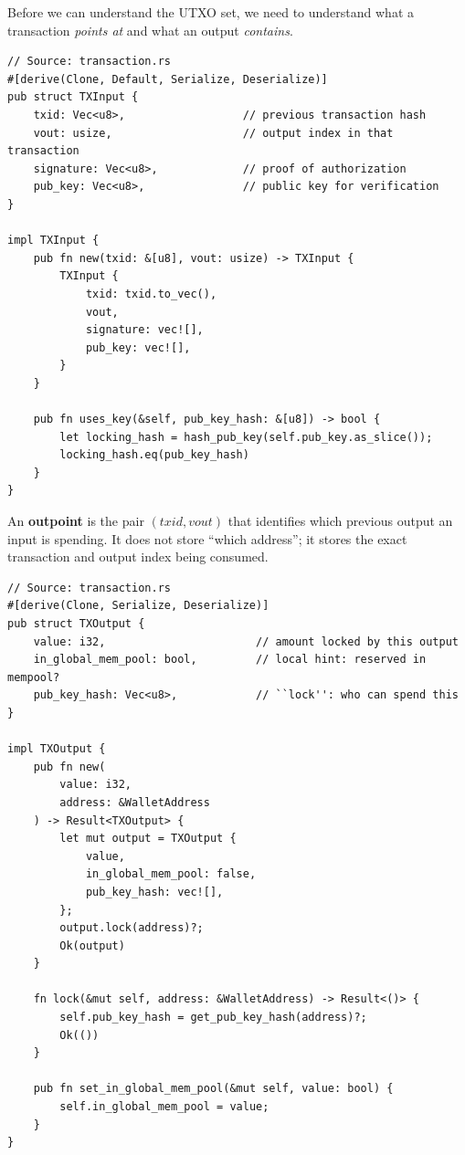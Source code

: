 Before we can understand the UTXO set, we need to understand what a transaction \emph{points at} and what an output \emph{contains}.

\begin{listing}[htbp]
\caption{: reference to a previous output and authorization}
\label{lst:ch09-4-2}
\begin{verbatim}
// Source: transaction.rs
#[derive(Clone, Default, Serialize, Deserialize)]
pub struct TXInput {
    txid: Vec<u8>,                  // previous transaction hash
    vout: usize,                    // output index in that transaction
    signature: Vec<u8>,             // proof of authorization
    pub_key: Vec<u8>,               // public key for verification
}

impl TXInput {
    pub fn new(txid: &[u8], vout: usize) -> TXInput {
        TXInput {
            txid: txid.to_vec(),
            vout,
            signature: vec![],
            pub_key: vec![],
        }
    }

    pub fn uses_key(&self, pub_key_hash: &[u8]) -> bool {
        let locking_hash = hash_pub_key(self.pub_key.as_slice());
        locking_hash.eq(pub_key_hash)
    }
}
\end{verbatim}
\end{listing}

\begin{notebox}
An \textbf{outpoint} is the pair \((txid, vout)\) that identifies which previous output an input is spending. It does not store ``which address''; it stores the exact transaction and output index being consumed.
\end{notebox}

\begin{listing}[htbp]
\caption{: value and the ``in mempool'' flag}
\label{lst:ch09-4-3}
\begin{verbatim}
// Source: transaction.rs
#[derive(Clone, Serialize, Deserialize)]
pub struct TXOutput {
    value: i32,                       // amount locked by this output
    in_global_mem_pool: bool,         // local hint: reserved in mempool?
    pub_key_hash: Vec<u8>,            // ``lock'': who can spend this
}

impl TXOutput {
    pub fn new(
        value: i32,
        address: &WalletAddress
    ) -> Result<TXOutput> {
        let mut output = TXOutput {
            value,
            in_global_mem_pool: false,
            pub_key_hash: vec![],
        };
        output.lock(address)?;
        Ok(output)
    }

    fn lock(&mut self, address: &WalletAddress) -> Result<()> {
        self.pub_key_hash = get_pub_key_hash(address)?;
        Ok(())
    }

    pub fn set_in_global_mem_pool(&mut self, value: bool) {
        self.in_global_mem_pool = value;
    }
}
\end{verbatim}
\end{listing}


